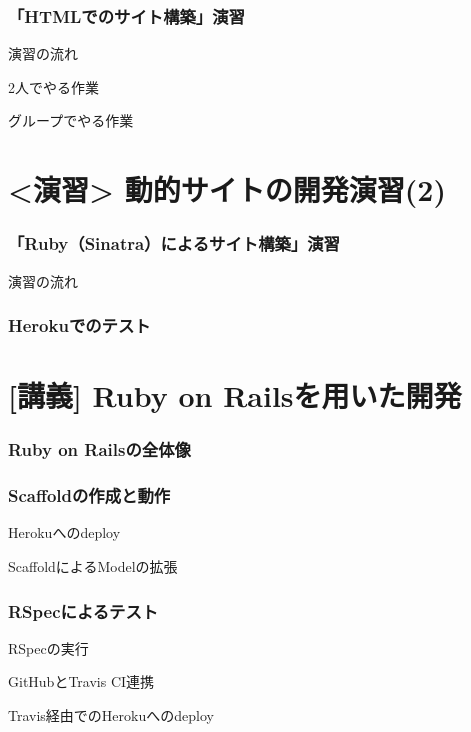 \documentclass[t, aspectratio=169]{beamer}
\begin{document}
\section{「HTMLでのサイト構築」演習}
\label{sec-6-4}
\begin{frame}[label=sec-6-4-1]{演習の流れ}
\end{frame}
\begin{frame}[label=sec-6-4-2]{}
\end{frame}
\begin{frame}[label=sec-6-4-3]{2人でやる作業}
\end{frame}
\begin{frame}[label=sec-6-4-4]{グループでやる作業}
\end{frame}
\part{<演習> 動的サイトの開発演習(2)}
\label{sec-7}
\section{「Ruby（Sinatra）によるサイト構築」演習}
\label{sec-7-1}
\begin{frame}[label=sec-7-1-1]{演習の流れ}
\end{frame}
\section{Herokuでのテスト}
\label{sec-7-2}
\part{[講義] Ruby on Railsを用いた開発}
\label{sec-8}
\section{Ruby on Railsの全体像}
\label{sec-8-1}
\section{Scaffoldの作成と動作}
\label{sec-8-2}
\begin{frame}[label=sec-8-2-1]{Herokuへのdeploy}
\end{frame}
\begin{frame}[label=sec-8-2-2]{ScaffoldによるModelの拡張}
\end{frame}
\section{RSpecによるテスト}
\label{sec-8-3}
\begin{frame}[label=sec-8-3-1]{RSpecの実行}
\end{frame}
\begin{frame}[label=sec-8-3-2]{GitHubとTravis CI連携}
\end{frame}
\begin{frame}[label=sec-8-3-3]{Travis経由でのHerokuへのdeploy}
\end{frame}
\end{document}
